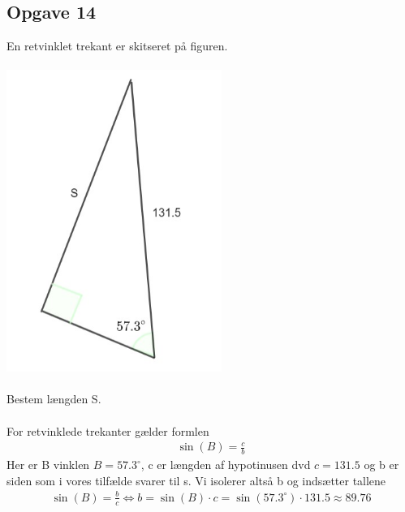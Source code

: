 \subsection{Opgave 14}

En retvinklet trekant er skitseret på figuren.\\\\
\includegraphics[width=7cm]{Opgave_11-20/Opgave_14/Opgave_14.jpg}\\\\
Bestem længden S.\\\\

\ans
For retvinklede trekanter gælder formlen
\begin{align*}
    \sin(B) = \frac{c}{b}
\end{align*}
Her er B vinklen $B = 57.3^{\circ}$, c er længden af hypotinusen dvd $c = 131.5$ og b er siden som i vores tilfælde svarer til s. Vi isolerer altså b og indsætter tallene
\begin{align*}
    \sin(B) = \frac{b}{c} \Longleftrightarrow b = \sin(B)\cdot c = \sin(57.3^{\circ})\cdot 131.5 \approx 89.76
\end{align*}
